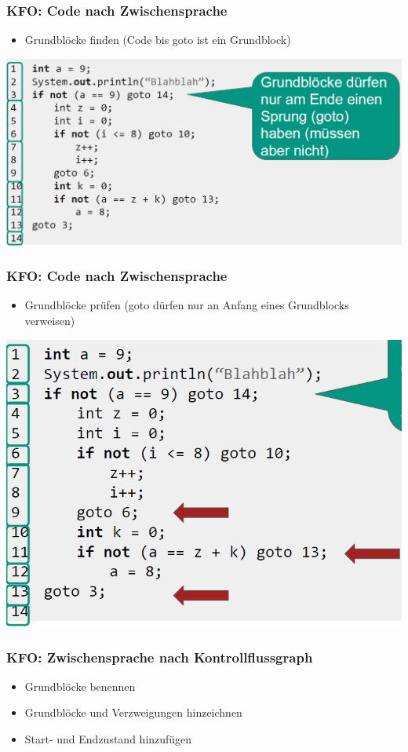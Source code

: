 \documentclass[18pt]{beamer}
\begin{document}
	\begin{frame}
		\frametitle{KFO: Code nach Zwischensprache}
		\begin{itemize}
			\item Grundblöcke finden (Code bis goto ist ein Grundblock)
		\end{itemize}
		\centering \includegraphics[scale=0.34]{./pics/tut5/first-blocks.png}
	\end{frame}

	\begin{frame}
		\frametitle{KFO: Code nach Zwischensprache}
		\begin{itemize}
			\item 	Grundblöcke prüfen (goto dürfen nur an Anfang eines Grundblocks verweisen)
		\end{itemize}
			\centering \includegraphics[scale=0.34]{./pics/tut5/second-blocks.png}
	\end{frame}

	\begin{frame}
		\frametitle{KFO: Zwischensprache nach Kontrollflussgraph}
		\begin{itemize}
			\item Grundblöcke benennen
			\item Grundblöcke und Verzweigungen hinzeichnen
			\item Start- und Endzustand hinzufügen
		\end{itemize}
	\end{frame}
\end{document}
